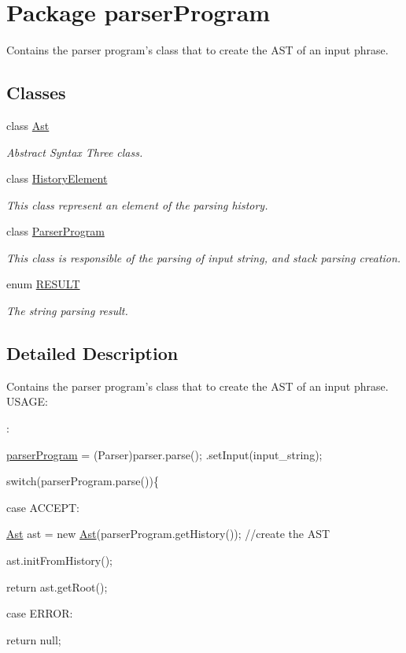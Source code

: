 \hypertarget{namespaceparser_program}{\section{Package parser\-Program}
\label{namespaceparser_program}
}


Contains the parser program's class that to create the A\-S\-T of an input phrase.  


\subsection*{Classes}
\begin{DoxyCompactItemize}
\item 
class \hyperlink{classparser_program_1_1_ast}{Ast}
\begin{DoxyCompactList}\small\item\em Abstract Syntax Three class. \end{DoxyCompactList}\item 
class \hyperlink{classparser_program_1_1_history_element}{History\-Element}
\begin{DoxyCompactList}\small\item\em This class represent an element of the parsing history. \end{DoxyCompactList}\item 
class \hyperlink{classparser_program_1_1_parser_program}{Parser\-Program}
\begin{DoxyCompactList}\small\item\em This class is responsible of the parsing of input string, and stack parsing creation. \end{DoxyCompactList}\item 
enum \hyperlink{enumparser_program_1_1_r_e_s_u_l_t}{R\-E\-S\-U\-L\-T}
\begin{DoxyCompactList}\small\item\em The string parsing result. \end{DoxyCompactList}\end{DoxyCompactItemize}


\subsection{Detailed Description}
Contains the parser program's class that to create the A\-S\-T of an input phrase. U\-S\-A\-G\-E\-:\par
 \-:\par
  \hyperlink{namespaceparser_program}{parser\-Program} = (Parser)parser.\-parse(); .set\-Input(input\-\_\-string); \par
 switch(parser\-Program.\-parse())\{ \par
 case A\-C\-C\-E\-P\-T\-: \par
 \hyperlink{classparser_program_1_1_ast}{Ast} ast = new \hyperlink{classparser_program_1_1_ast}{Ast}(parser\-Program.\-get\-History()); //create the A\-S\-T \par
 ast.\-init\-From\-History(); \par
 return ast.\-get\-Root(); \par
 case E\-R\-R\-O\-R\-: \par
 return null; 